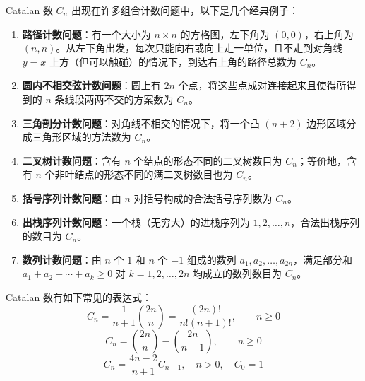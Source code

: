 Catalan 数 $C_n$ 出现在许多组合计数问题中，以下是几个经典例子：

\begin{enumerate}
    \item \textbf{路径计数问题}：有一个大小为 $n \times n$ 的方格图，左下角为 $(0,0)$，右上角为 $(n,n)$。从左下角出发，每次只能向右或向上走一单位，且不走到对角线 $y=x$ 上方（但可以触碰）的情况下，到达右上角的路径总数为 $C_n$。
    \item \textbf{圆内不相交弦计数问题}：圆上有 $2n$ 个点，将这些点成对连接起来且使得所得到的 $n$ 条线段两两不交的方案数为 $C_n$。
    \item \textbf{三角剖分计数问题}：对角线不相交的情况下，将一个凸 $(n+2)$ 边形区域分成三角形区域的方法数为 $C_n$。
    \item \textbf{二叉树计数问题}：含有 $n$ 个结点的形态不同的二叉树数目为 $C_n$；等价地，含有 $n$ 个非叶结点的形态不同的满二叉树数目也为 $C_n$。
    \item \textbf{括号序列计数问题}：由 $n$ 对括号构成的合法括号序列数为 $C_n$。
    \item \textbf{出栈序列计数问题}：一个栈（无穷大）的进栈序列为 $1,2,\dots,n$，合法出栈序列的数目为 $C_n$。
    \item \textbf{数列计数问题}：由 $n$ 个 $1$ 和 $n$ 个 $-1$ 组成的数列 $a_1,a_2,\dots,a_{2n}$，满足部分和 $a_1+a_2+\cdots+a_k \ge 0$ 对 $k=1,2,\dots,2n$ 均成立的数列数目为 $C_n$。
\end{enumerate}

Catalan 数有如下常见的表达式：
\[
C_n = \frac{1}{n+1}\binom{2n}{n} = \frac{(2n)!}{n!(n+1)!},\qquad n\ge 0 \tag{1}
\]
\[
C_n = \binom{2n}{n} - \binom{2n}{n+1},\qquad n\ge 0 \tag{2}
\]
\[
C_n = \frac{4n-2}{n+1}C_{n-1},\quad n>0,\quad C_0 = 1 \tag{3}
\]